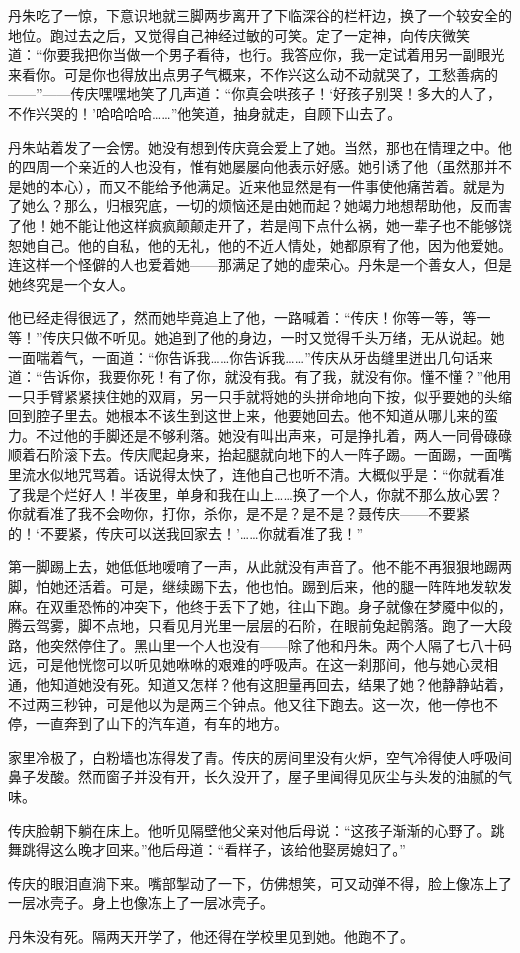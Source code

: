 \documentclass[UTF8]{ctexart}
\begin{document}
丹朱吃了一惊，下意识地就三脚两步离开了下临深谷的栏杆边，换了一个较安全的地位。跑过去之后，又觉得自己神经过敏的可笑。定了一定神，向传庆微笑道：“你要我把你当做一个男子看待，也行。我答应你，我一定试着用另一副眼光来看你。可是你也得放出点男子气概来，不作兴这么动不动就哭了，工愁善病的——”——传庆嘿嘿地笑了几声道：“你真会哄孩子！‘好孩子别哭！多大的人了，不作兴哭的！’哈哈哈哈……”他笑道，抽身就走，自顾下山去了。

丹朱站着发了一会愣。她没有想到传庆竟会爱上了她。当然，那也在情理之中。他的四周一个亲近的人也没有，惟有她屡屡向他表示好感。她引诱了他（虽然那并不是她的本心），而又不能给予他满足。近来他显然是有一件事使他痛苦着。就是为了她么？那么，归根究底，一切的烦恼还是由她而起？她竭力地想帮助他，反而害了他！她不能让他这样疯疯颠颠走开了，若是闯下点什么祸，她一辈子也不能够饶恕她自己。他的自私，他的无礼，他的不近人情处，她都原宥了他，因为他爱她。连这样一个怪僻的人也爱着她——那满足了她的虚荣心。丹朱是一个善女人，但是她终究是一个女人。

他已经走得很远了，然而她毕竟追上了他，一路喊着：“传庆！你等一等，等一等！”传庆只做不听见。她追到了他的身边，一时又觉得千头万绪，无从说起。她一面喘着气，一面道：“你告诉我……你告诉我……”传庆从牙齿缝里迸出几句话来道：“告诉你，我要你死！有了你，就没有我。有了我，就没有你。懂不懂？”他用一只手臂紧紧挟住她的双肩，另一只手就将她的头拼命地向下按，似乎要她的头缩回到腔子里去。她根本不该生到这世上来，他要她回去。他不知道从哪儿来的蛮力。不过他的手脚还是不够利落。她没有叫出声来，可是挣扎着，两人一同骨碌碌顺着石阶滚下去。传庆爬起身来，抬起腿就向地下的人一阵子踢。一面踢，一面嘴里流水似地咒骂着。话说得太快了，连他自己也听不清。大概似乎是：“你就看准了我是个烂好人！半夜里，单身和我在山上……换了一个人，你就不那么放心罢？你就看准了我不会吻你，打你，杀你，是不是？是不是？聂传庆——不要紧的！‘不要紧，传庆可以送我回家去！’……你就看准了我！”

第一脚踢上去，她低低地嗳唷了一声，从此就没有声音了。他不能不再狠狠地踢两脚，怕她还活着。可是，继续踢下去，他也怕。踢到后来，他的腿一阵阵地发软发麻。在双重恐怖的冲突下，他终于丢下了她，往山下跑。身子就像在梦魇中似的，腾云驾雾，脚不点地，只看见月光里一层层的石阶，在眼前兔起鹘落。跑了一大段路，他突然停住了。黑山里一个人也没有——除了他和丹朱。两个人隔了七八十码远，可是他恍惚可以听见她咻咻的艰难的呼吸声。在这一刹那间，他与她心灵相通，他知道她没有死。知道又怎样？他有这胆量再回去，结果了她？他静静站着，不过两三秒钟，可是他以为是两三个钟点。他又往下跑去。这一次，他一停也不停，一直奔到了山下的汽车道，有车的地方。

家里冷极了，白粉墙也冻得发了青。传庆的房间里没有火炉，空气冷得使人呼吸间鼻子发酸。然而窗子并没有开，长久没开了，屋子里闻得见灰尘与头发的油腻的气味。

传庆脸朝下躺在床上。他听见隔壁他父亲对他后母说：“这孩子渐渐的心野了。跳舞跳得这么晚才回来。”他后母道：“看样子，该给他娶房媳妇了。”

传庆的眼泪直淌下来。嘴部掣动了一下，仿佛想笑，可又动弹不得，脸上像冻上了一层冰壳子。身上也像冻上了一层冰壳子。

丹朱没有死。隔两天开学了，他还得在学校里见到她。他跑不了。
\end{document}
